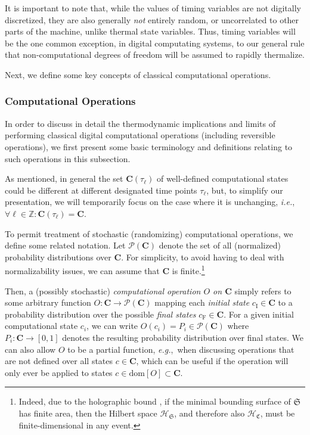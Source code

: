 \documentclass[preprints,article,accept,moreauthors,pdftex]{Definitions/mdpi}
\begin{document}
It is important to note that, while the values of timing variables are not digitally discretized, they are also generally \textit{not} entirely random, or uncorrelated to other parts of the machine, unlike thermal state variables. Thus, timing variables will be the one common exception, in digital computating systems, to our general rule that non-computational degrees of freedom will be assumed to rapidly thermalize.

Next, we define some key concepts of classical computational operations.

\subsubsection{Computational Operations}
\label{sssec:comp-oper}

In order to discuss in detail the thermodynamic implications and limits of performing classical digital computational operations (including reversible operations), we first present some basic terminology and definitions relating to such operations in this subsection.

As mentioned, in general the set $\boldsymbol{C}(\tau_\ell)$ of well-defined computational states could be different at different designated time points $\tau_\ell$, but, to simplify our presentation, we will temporarily focus on the case where it is unchanging, \emph{i.e.}, $\forall \ell\in\mathbb{Z}: \boldsymbol{C}(\tau_\ell) = \mathbf{C}$. 

To permit treatment of stochastic (randomizing) computational operations, we define some related notation. Let $\mathcal{P}(\mathbf{C})$ denote the set of all (normalized) probability distributions over $\mathbf{C}$. For simplicity, to avoid having to deal with normalizability issues, we can assume that $\mathbf{C}$ is finite.\footnote{Indeed, due to the holographic bound \cite{Bek00}, if the minimal bounding surface of $\mathfrak{S}$ has finite area, then the Hilbert space $\mathcal{H}_\mathfrak{S}$, and therefore also $\mathcal{H}_\mathfrak{C}$, must be finite-dimensional in any event.} 

Then, a (possibly stochastic) \emph{computational operation $O$ on $\mathbf{C}$} simply refers to some arbitrary function $O:\mathbf{C} \rightarrow \mathcal{P}(\mathbf{C})$ mapping each \emph{initial state} $c_\mathrm{I}\in \mathbf{C}$ to a probability distribution over the possible \emph{final states} $c_\mathrm{F}\in\mathbf{C}$. For a given initial computational state $c_i$, we can write $O(c_i)=P_i\in \mathcal{P}(\mathbf{C})$ where $P_i:\mathbf{C}\rightarrow [0,1]$ denotes the resulting probability distribution over final states. We can also allow $O$ to be a partial function, \emph{e.g.},\ when discussing operations that are not defined over all states $c\in\mathbf{C}$, which can be useful if the operation will only ever be applied to states $c\in\mathrm{dom}[O]\subset\mathbf{C}$.
\end{document}
